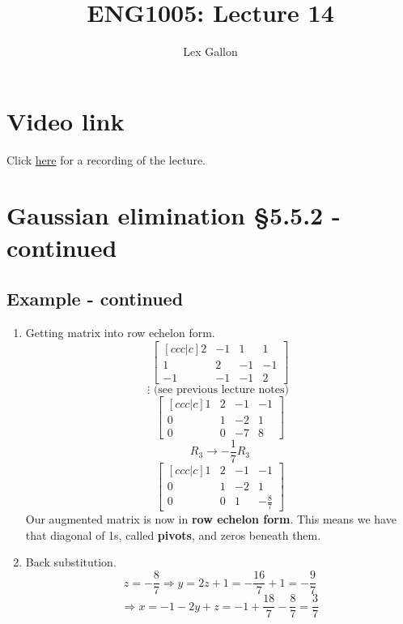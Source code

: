 \documentclass[11pt]{article}
\begin{document}
\title{ENG1005: Lecture 14}
\author{Lex Gallon}
\maketitle

\tableofcontents

\section*{Video link}
Click \href{https://echo360.org.au/lesson/G_32340f5d-ff38-43d2-be9d-d88ddb1b3611_b944cecf-8ba5-40d3-a870-0243a0a9e78c_2020-04-22T14:58:00.000_2020-04-22T15:53:00.000/classroom#sortDirection=desc}{here} for a recording of the lecture.

\section{Gaussian elimination §5.5.2 - continued}
\subsection{Example - continued}
\begin{enumerate}[ (i) ]
\item Getting matrix into row echelon form.
\[
\begin{bmatrix}[ccc|c]
2 & -1 & 1 & 1 \\
1 & 2 & -1 & -1 \\
-1 & -1 & -1 & 2
\end{bmatrix}
\]
\[ \vdots \text{ (see previous lecture notes) }\]
\[
\begin{bmatrix}[ccc|c]
1 & 2 & -1 & -1 \\
0 & 1 & -2 & 1 \\
0 & 0 & -7 & 8
\end{bmatrix}
\]
\[ R_3 \rightarrow -\frac{1}{7}R_3 \]
\[
\begin{bmatrix}[ccc|c]
1 & 2 & -1 & -1 \\
0 & 1 & -2 & 1 \\
0 & 0 & 1 & -\frac{8}{7}
\end{bmatrix}
\]
Our augmented matrix is now in \textbf{row echelon form}. This means we have that diagonal of 1s, called \textbf{pivots}, and zeros beneath them.

\item Back substitution.
\[ z = -\frac{8}{7} \Rightarrow y = 2z + 1 = -\frac{16}{7} + 1 = -\frac{9}{7}\]
\[ \Rightarrow x = -1 - 2y + z = -1 + \frac{18}{7} - \frac{8}{7} = \frac{3}{7} \]

\end{enumerate}
\end{document}
